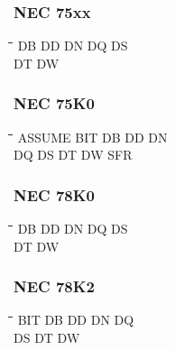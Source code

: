 \subsubsection{NEC 75xx}
{\tt\begin{tabbing}
\hspace{3cm}\=\hspace{3cm}\=\hspace{3cm}\=\hspace{3cm}\=\kill
DB         \> DD          \> DN          \> DQ          \>DS \\
DT         \> DW \\
\end{tabbing}}

\subsubsection{NEC 75K0}
{\tt\begin{tabbing}
\hspace{3cm}\=\hspace{3cm}\=\hspace{3cm}\=\hspace{3cm}\=\kill
ASSUME     \> BIT         \> DB          \> DD          \> DN \\
DQ         \> DS          \> DT          \> DW          \> SFR \\
\end{tabbing}}

\subsubsection{NEC 78K0}
{\tt\begin{tabbing}
\hspace{3cm}\=\hspace{3cm}\=\hspace{3cm}\=\hspace{3cm}\=\kill
DB         \> DD          \> DN          \> DQ          \> DS \\
DT         \> DW \\
\end{tabbing}}

\subsubsection{NEC 78K2}
{\tt\begin{tabbing}
\hspace{3cm}\=\hspace{3cm}\=\hspace{3cm}\=\hspace{3cm}\=\kill
BIT        \> DB         \> DD          \> DN          \> DQ \\
DS         \> DT         \> DW \\
\end{tabbing}}

